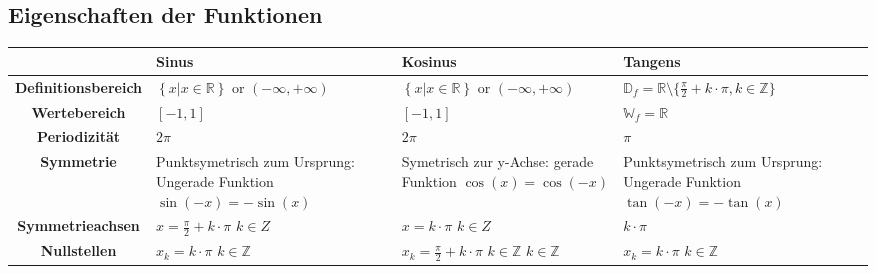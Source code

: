 \subsection{Eigenschaften der Funktionen}
\begin{tabularx}{1\textwidth} {
    | >{\raggedright\arraybackslash}c
    | >{\raggedright\arraybackslash}X
    | >{\raggedright\arraybackslash}X
    | >{\raggedright\arraybackslash}X |}
  \hline
                              & \textbf{Sinus}                                                       & \textbf{Kosinus}                                                             & \textbf{Tangens}                                                                       \\\hline
  \textbf{Definitionsbereich} & $\left\{ x|x\in\mathbb{R}\right\}$ or $\left(-\infty,+\infty\right)$ & $\left\{ x|x\in\mathbb{R}\right\}$ or $\left(-\infty,+\infty\right)$         & $\mathbb{D}_f = \mathbb{R}\setminus\{\tfrac{\pi}{2} + k \cdot \pi, k \in \mathbb{Z}\}$ \\ \hline
  \textbf{Wertebereich}       & $\left[-1,1\right]$                                                  & $\left[-1,1\right]$                                                          & $\mathbb{W}_f = \mathbb{R}$                                                            \\ \hline
  \textbf{Periodizität}       & $2\pi$                                                               & $2\pi$                                                                       & $\pi$                                                                                  \\ \hline
  \textbf{Symmetrie}          & Punktsymetrisch zum Ursprung: Ungerade Funktion $\sin(-x)=-\sin(x)$  & Symetrisch zur y-Achse: gerade Funktion $\cos(x) = \cos(-x)$                 & Punktsymetrisch zum Ursprung: Ungerade Funktion $\tan(-x)=-\tan(x)$                    \\ \hline
  \textbf{Symmetrieachsen}    & $x=\frac{\pi}{2}+k\cdot \pi$ $k \in Z$                               & $x=k\cdot \pi$ $k \in Z$                                                     & $k \cdot \pi$                                                                          \\ \hline
  \textbf{Nullstellen}        & $x_k = k \cdot \pi$ $k \in \mathbb{Z}$                               & $x_k = \frac{\pi}{2} + k \cdot \pi$ $k \in \mathbb{Z}$    $k \in \mathbb{Z}$ & $x_k = k \cdot \pi$   $k \in \mathbb{Z}$                                               \\ \hline

\end{tabularx}
